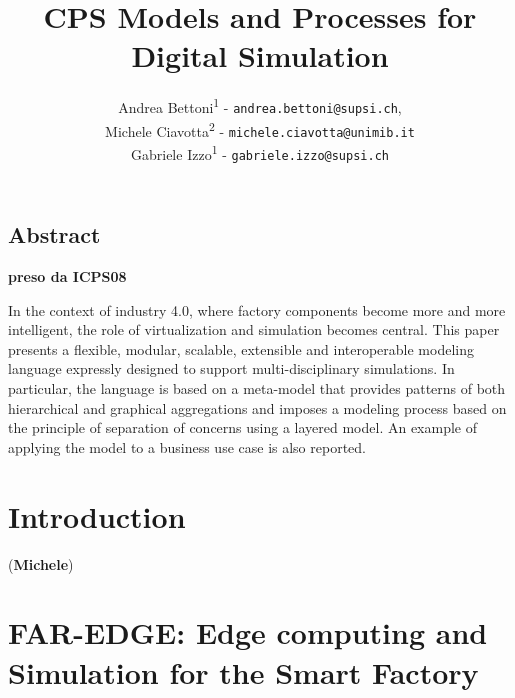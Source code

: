 \documentclass{riverk}
\begin{document}
\setcounter{article}{7}

\begin{opening}
\title[CPS Models and Processes for Digital Simulation]{CPS Models and Processes for Digital Simulation %
            }
\author{Andrea Bettoni\textsuperscript{1} - \texttt{andrea.bettoni@supsi.ch},\\
	Michele Ciavotta\textsuperscript{2} - \texttt{michele.ciavotta@unimib.it}\\
	Gabriele Izzo\textsuperscript{1} - \texttt{gabriele.izzo@supsi.ch}}
\end{opening}

\subsection*{Abstract}
\textbf{preso da ICPS08}

In the context of industry 4.0, where factory components become more and more intelligent, the role of virtualization and simulation becomes central. This paper presents a flexible, modular, scalable, extensible and interoperable modeling language expressly designed to support multi-disciplinary simulations. In particular, the language is based on a meta-model that provides patterns of both hierarchical and graphical aggregations and imposes a modeling process based on the principle of separation of concerns using a layered model. An example of applying the model to a business use case is also reported. 


\section{Introduction} 
(\textbf{Michele})


\section{FAR-EDGE: Edge computing and Simulation for the Smart Factory}

\end{document}
